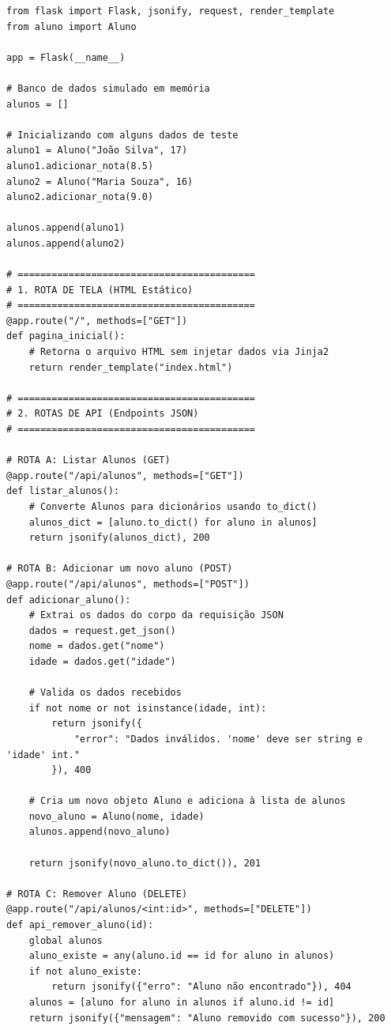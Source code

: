 \documentclass[12pt,a4paper]{article}
\begin{document}
\begin{boxCodigo}
\begin{verbatim}
from flask import Flask, jsonify, request, render_template
from aluno import Aluno

app = Flask(__name__)

# Banco de dados simulado em memória
alunos = []

# Inicializando com alguns dados de teste
aluno1 = Aluno("João Silva", 17)
aluno1.adicionar_nota(8.5)
aluno2 = Aluno("Maria Souza", 16)
aluno2.adicionar_nota(9.0)

alunos.append(aluno1)
alunos.append(aluno2)

# ==========================================
# 1. ROTA DE TELA (HTML Estático)
# ==========================================
@app.route("/", methods=["GET"])
def pagina_inicial():
    # Retorna o arquivo HTML sem injetar dados via Jinja2
    return render_template("index.html")

# ==========================================
# 2. ROTAS DE API (Endpoints JSON)
# ==========================================

# ROTA A: Listar Alunos (GET)
@app.route("/api/alunos", methods=["GET"])
def listar_alunos():
    # Converte Alunos para dicionários usando to_dict()
    alunos_dict = [aluno.to_dict() for aluno in alunos]
    return jsonify(alunos_dict), 200

# ROTA B: Adicionar um novo aluno (POST)
@app.route("/api/alunos", methods=["POST"])
def adicionar_aluno():
    # Extrai os dados do corpo da requisição JSON
    dados = request.get_json()
    nome = dados.get("nome")
    idade = dados.get("idade")

    # Valida os dados recebidos
    if not nome or not isinstance(idade, int):
        return jsonify({
            "error": "Dados inválidos. 'nome' deve ser string e 'idade' int."
        }), 400

    # Cria um novo objeto Aluno e adiciona à lista de alunos
    novo_aluno = Aluno(nome, idade)
    alunos.append(novo_aluno)

    return jsonify(novo_aluno.to_dict()), 201

# ROTA C: Remover Aluno (DELETE)
@app.route("/api/alunos/<int:id>", methods=["DELETE"])
def api_remover_aluno(id):
    global alunos
    aluno_existe = any(aluno.id == id for aluno in alunos)
    if not aluno_existe:
        return jsonify({"erro": "Aluno não encontrado"}), 404
    alunos = [aluno for aluno in alunos if aluno.id != id]
    return jsonify({"mensagem": "Aluno removido com sucesso"}), 200
\end{verbatim}
\end{boxCodigo}
\end{document}
